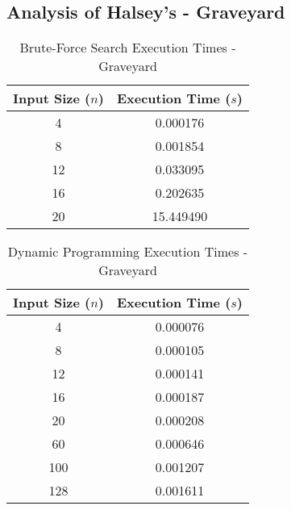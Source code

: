\documentclass[conference]{IEEEtran}
\begin{document}
\subsection{Analysis of Halsey's - Graveyard}
\begin{table}[H]
    \centering 
    \caption{Brute-Force Search Execution Times - Graveyard}
    \renewcommand{\arraystretch}{1.2} %
    \setlength{\tabcolsep}{3pt} %
    \begin{tabular}{|c|c|}
        \hline 
        \textbf{Input Size ($n$)} & \textbf{Execution Time ($s$)} \\
        \hline 
        4 & 0.000176 \\
        \hline 
        8 & 0.001854 \\
        \hline 
        12 & 0.033095\\
        \hline 
        16 & 0.202635 \\
        \hline 
        20 & 15.449490 \\
        \hline
    \end{tabular}
\end{table}
\begin{table}[H]
    \centering
    \caption{Dynamic Programming Execution Times - Graveyard}
    \renewcommand{\arraystretch}{1.2} %
    \setlength{\tabcolsep}{3pt} %
    \begin{tabular}{|c|c|}
        \hline 
        \textbf{Input Size ($n$)} & \textbf{Execution Time ($s$)} \\
        \hline 
        4 & 0.000076 \\
        \hline 
        8 & 0.000105 \\
        \hline 
        12 & 0.000141 \\
        \hline 
        16 & 0.000187 \\
        \hline 
        20 & 0.000208 \\
        \hline 
        60 & 0.000646 \\
        \hline 
        100 & 0.001207 \\
        \hline
        128 & 0.001611 \\
        \hline
    \end{tabular}
\end{table}
\end{document}
